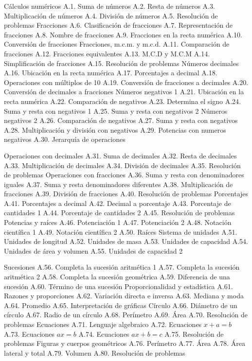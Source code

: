 Cálculos numéricos
A.1.  Suma de números
A.2.  Resta de números
A.3.  Multiplicación de números
A.4.  División de números
A.5.  Resolución de problemas
Fracciones
A.6.  Clasificación de fracciones
A.7.  Representación de fracciones
A.8.  Nombre de fracciones
A.9.  Fracciones en la recta numérica
A.10. Conversión de fracciones
Fracciones, m.c.m. y m.c.d.
A.11. Comparación de fracciones
A.12. Fracciones equivalentes
A.13. M.C.D y M.C.M
A.14. Simplificación de fracciones
A.15. Resolución de problemas
Números decimales
A.16. Ubicación en la recta numérica
A.17. Porcentajes a decimal
A.18. Operaciones con múltiplos de 10
A.19. Conversión de fracciones a decimales
A.20. Conversión de decimales a fracciones
Números negativos 1
A.21. Ubicación en la recta numérica
A.22. Comparación de negativos
A.23. Determina el signo
A.24. Suma y resta con negativos 1
A.25. Suma y resta con negativos 2
Números negativos 2
A.26. Comparación de negativos
A.27. Suma y resta con negativos
A.28. Multiplicación y división con negativos
A.29. Potencias con numeros negativos
A.30. Jerarquía de operaciones

Operaciones con decimales
A.31. Suma de decimales
A.32. Resta de decimales
A.33. Multiplicación de decimales
A.34. División de decimales
A.35. Resolución de problemas
Operaciones con fracciones
A.36. Suma y resta con denominadores iguales
A.37. Suma y resta denominadores diferentes
A.38. Multiplicación de fracciones
A.39. División de fracciones
A.40. Resolución de problemas
Porcentajes
A.41. Porcentajes a decimal
A.42. Decimal a porcentaje
A.43. Porcentaje de cantidades 1
A.44. Porcentaje de cantidades 2
A.45. Resolución de problemas
Potencias y raíces
A.46. Potenciación 1
A.47. Potenciación 2
A.48. Notación científica 1
A.49. Notación científica 2
A.50. Raíces
Sistema de unidades
A.51. Unidades de longitud
A.52. Unidades de masa
A.53. Unidades de capacidad
A.54. Unidades de área y volumen
A.55. Unidades de capacidad 2

Sucesiones
A.56. Completa la sucesión aritmética 1
A.57. Completa la sucesión aritmética 2
A.58. Completa la sucesión geométrica
A.59. Diferencia de una sucesión
A.60. Término de una sucesión
Proporcionalidad y estadística
A.61. Razones y proporciones
A.62. Variación directa e inversa
A.63. Mediana y moda
A.64. Promedio
A.65. Interpretación de gráficas
Círculo
A.66. Diámetro de un círculo
A.67. Radio de un círculo
A.68. Perímetro
A.69. Área
A.70. Resolución de problemas
Ecuaciones
A.71. Lenguaje algebraico
A.72. Ecuaciones $x+a=b$
A.73. Ecuaciones $ax=b$
A.74. Ecuaciones $ax+b=c$
A.75. Resolución de problemas
Figuras y cuerpos geométricos
A.76. Perímetro
A.77. Área
A.78. Área lateral y total
A.79. Volumen
A.80. Resolución de problemas